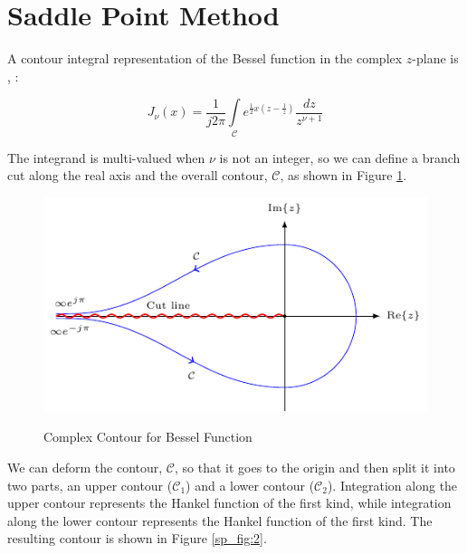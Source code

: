 \section{Saddle Point Method}\label{appendix_saddle_point_method}
A contour integral representation of the Bessel function in the complex $z$-plane is \cite{arfken_weber}, \cite{nist_handbook}:

\begin{equation}
  J_{\nu}(x) = \frac{1}{j2\pi}\int\limits_{\mathcal{C}}e^{\frac{1}{2}x\left(z- \frac{1}{z} \right)} \frac{dz}{z^{\nu+1}}
  \label{sp_eq:1}
\end{equation}
\renewcommand{\baselinestretch}{2} \small\normalsize

The integrand is multi-valued when $\nu$ is not an integer, so we can define a branch cut along the real axis and the overall contour, $\mathcal{C}$, as shown in Figure \ref{sp_fig:1}.

\begin{figure}[ht]
  \begin{center}
\includegraphics[width=5in]{../media/hankel_contours-figure0.pdf}
  \end{center}
  \renewcommand{\baselinestretch}{1} \small\normalsize
  \begin{quote}
    \caption[Complex Contour for Bessel Function]{ Complex Contour for Bessel Function\label{sp_fig:1}}
  \end{quote}
\end{figure}
\renewcommand{\baselinestretch}{2} \small\normalsize

We can deform the contour, $\mathcal{C}$, so that it goes to the origin and then split it into two parts, an upper contour ($\mathcal{C}_1$) and a lower contour ($\mathcal{C}_2$). Integration along the upper contour represents the Hankel function of the first kind, while integration along the lower contour represents the Hankel function of the first kind. The resulting contour is shown in Figure \ref{sp_fig:2}.

